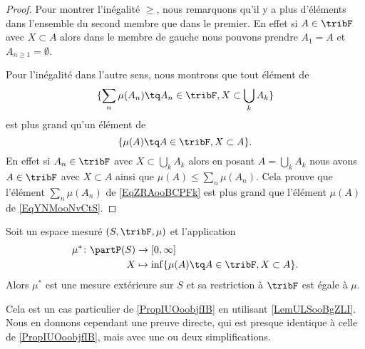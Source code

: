 \begin{proof}
    Pour montrer l'inégalité \( \geq\), nous remarquons qu'il y a plus d'éléments dans l'ensemble du second membre que dans le premier. En effet si \( A\in\tribF\) avec \( X\subset A\) alors dans le membre de gauche nous pouvons prendre \( A_1=A\) et \( A_{n\geq 1}=\emptyset\).

    Pour l'inégalité dans l'autre sens, nous montrons que tout élément de
    \begin{equation}    \label{EqZRAooBCPFk}
        \{ \sum_n\mu(A_n)\tq A_n\in\tribF,X\subset\bigcup_kA_k \}
    \end{equation}
    est plus grand qu'un élément de
    \begin{equation}    \label{EqYNMooNvCtS}
        \{ \mu(A)\tq A\in\tribF,X\subset A \}.
    \end{equation}
    En effet si \( A_n\in\tribF\) avec \( X\subset \bigcup_kA_k\) alors en posant \( A=\bigcup_kA_k\) nous avons \( A\in\tribF\) avec \( X\subset A\) ainsi que \( \mu(A)\leq\sum_n\mu(A_n)\). Cela prouve que l'élément \( \sum_n\mu(A_n)\) de \eqref{EqZRAooBCPFk} est plus grand que l'élément \( \mu(A)\) de \eqref{EqYNMooNvCtS}.
\end{proof}

\begin{proposition}    \label{PropFDUooVxJaJ}
    Soit un espace mesuré \( (S,\tribF,\mu)\) et l'application
    \begin{equation}
        \begin{aligned}
            \mu^*\colon \partP(S)&\to \mathopen[ 0 , \infty \mathclose] \\
            X&\mapsto \inf\{ \mu(A)\tq A\in\tribF,X\subset A \}. 
        \end{aligned}
    \end{equation}
    Alors \( \mu^*\) est une mesure extérieure sur \( S\) et sa restriction à \( \tribF\) est égale à \( \mu\).
\end{proposition}

Cela est un cas particulier de \ref{PropIUOoobjfIB} en utilisant \ref{LemULSooBgZLI}. Nous en donnons cependant une preuve directe, qui est presque identique à celle de \ref{PropIUOoobjfIB}, mais avec une ou deux simplifications.

